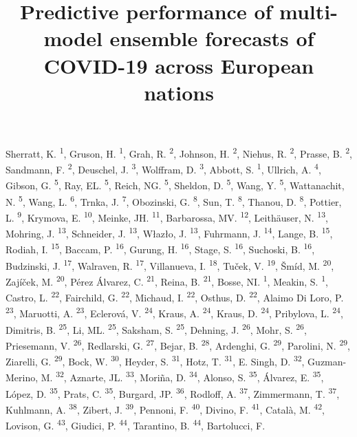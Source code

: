 \documentclass[
]{article}
\title{Predictive performance of multi-model ensemble forecasts of COVID-19 across European nations}
\author{}
\date{\vspace{-2.5em}}
\begin{document}
\maketitle

{
\setcounter{tocdepth}{2}
\tableofcontents
}
Sherratt, K. \textsuperscript{1}, Gruson, H. \textsuperscript{1}, Grah, R. \textsuperscript{2}, Johnson, H. \textsuperscript{2}, Niehus, R. \textsuperscript{2}, Prasse, B. \textsuperscript{2}, Sandmann, F. \textsuperscript{2}, Deuschel, J. \textsuperscript{3}, Wolffram, D. \textsuperscript{3}, Abbott, S. \textsuperscript{1}, Ullrich, A. \textsuperscript{4}, Gibson, G. \textsuperscript{5}, Ray, EL. \textsuperscript{5}, Reich, NG. \textsuperscript{5}, Sheldon, D. \textsuperscript{5}, Wang, Y. \textsuperscript{5}, Wattanachit, N. \textsuperscript{5}, Wang, L. \textsuperscript{6}, Trnka, J. \textsuperscript{7}, Obozinski, G. \textsuperscript{8}, Sun, T. \textsuperscript{8}, Thanou, D. \textsuperscript{8}, Pottier, L. \textsuperscript{9}, Krymova, E. \textsuperscript{10}, Meinke, JH. \textsuperscript{11}, Barbarossa, MV. \textsuperscript{12}, Leithäuser, N. \textsuperscript{13}, Mohring, J. \textsuperscript{13}, Schneider, J. \textsuperscript{13}, Włazło, J. \textsuperscript{13}, Fuhrmann, J. \textsuperscript{14}, Lange, B. \textsuperscript{15}, Rodiah, I. \textsuperscript{15}, Baccam, P. \textsuperscript{16}, Gurung, H. \textsuperscript{16}, Stage, S. \textsuperscript{16}, Suchoski, B. \textsuperscript{16}, Budzinski, J. \textsuperscript{17}, Walraven, R. \textsuperscript{17}, Villanueva, I. \textsuperscript{18}, Tuček, V. \textsuperscript{19}, Šmíd, M. \textsuperscript{20}, Zajíček, M. \textsuperscript{20}, Pérez Álvarez, C. \textsuperscript{21}, Reina, B. \textsuperscript{21}, Bosse, NI. \textsuperscript{1}, Meakin, S. \textsuperscript{1}, Castro, L. \textsuperscript{22}, Fairchild, G. \textsuperscript{22}, Michaud, I. \textsuperscript{22}, Osthus, D. \textsuperscript{22}, Alaimo Di Loro, P. \textsuperscript{23}, Maruotti, A. \textsuperscript{23}, Eclerová, V. \textsuperscript{24}, Kraus, A. \textsuperscript{24}, Kraus, D. \textsuperscript{24}, Pribylova, L. \textsuperscript{24}, Dimitris, B. \textsuperscript{25}, Li, ML. \textsuperscript{25}, Saksham, S. \textsuperscript{25}, Dehning, J. \textsuperscript{26}, Mohr, S. \textsuperscript{26}, Priesemann, V. \textsuperscript{26}, Redlarski, G. \textsuperscript{27}, Bejar, B. \textsuperscript{28}, Ardenghi, G. \textsuperscript{29}, Parolini, N. \textsuperscript{29}, Ziarelli, G. \textsuperscript{29}, Bock, W. \textsuperscript{30}, Heyder, S. \textsuperscript{31}, Hotz, T. \textsuperscript{31}, E. Singh, D. \textsuperscript{32}, Guzman-Merino, M. \textsuperscript{32}, Aznarte, JL. \textsuperscript{33}, Moriña, D. \textsuperscript{34}, Alonso, S. \textsuperscript{35}, Álvarez, E. \textsuperscript{35}, López, D. \textsuperscript{35}, Prats, C. \textsuperscript{35}, Burgard, JP. \textsuperscript{36}, Rodloff, A. \textsuperscript{37}, Zimmermann, T. \textsuperscript{37}, Kuhlmann, A. \textsuperscript{38}, Zibert, J. \textsuperscript{39}, Pennoni, F. \textsuperscript{40}, Divino, F. \textsuperscript{41}, Català, M. \textsuperscript{42}, Lovison, G. \textsuperscript{43}, Giudici, P. \textsuperscript{44}, Tarantino, B. \textsuperscript{44}, Bartolucci, F. 
\end{document}
